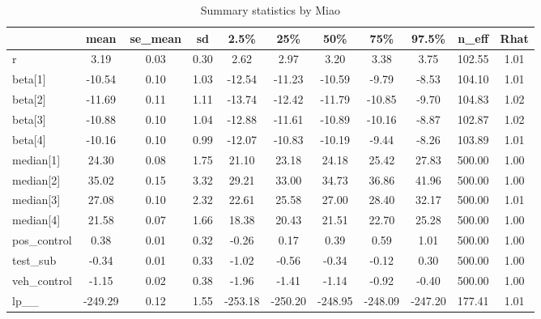 \documentclass[]{article}
\begin{document}
\begin{table}

\caption{\label{tab:result2}Summary statistics by Miao}
\centering
\begin{tabular}[t]{l|c|c|c|c|c|c|c|c|c|c}
\hline
  & mean & se\_mean & sd & 2.5\% & 25\% & 50\% & 75\% & 97.5\% & n\_eff & Rhat\\
\hline
r & 3.19 & 0.03 & 0.30 & 2.62 & 2.97 & 3.20 & 3.38 & 3.75 & 102.55 & 1.01\\
\hline
beta[1] & -10.54 & 0.10 & 1.03 & -12.54 & -11.23 & -10.59 & -9.79 & -8.53 & 104.10 & 1.01\\
\hline
beta[2] & -11.69 & 0.11 & 1.11 & -13.74 & -12.42 & -11.79 & -10.85 & -9.70 & 104.83 & 1.02\\
\hline
beta[3] & -10.88 & 0.10 & 1.04 & -12.88 & -11.61 & -10.89 & -10.16 & -8.87 & 102.87 & 1.02\\
\hline
beta[4] & -10.16 & 0.10 & 0.99 & -12.07 & -10.83 & -10.19 & -9.44 & -8.26 & 103.89 & 1.01\\
\hline
median[1] & 24.30 & 0.08 & 1.75 & 21.10 & 23.18 & 24.18 & 25.42 & 27.83 & 500.00 & 1.00\\
\hline
median[2] & 35.02 & 0.15 & 3.32 & 29.21 & 33.00 & 34.73 & 36.86 & 41.96 & 500.00 & 1.00\\
\hline
median[3] & 27.08 & 0.10 & 2.32 & 22.61 & 25.58 & 27.00 & 28.40 & 32.17 & 500.00 & 1.01\\
\hline
median[4] & 21.58 & 0.07 & 1.66 & 18.38 & 20.43 & 21.51 & 22.70 & 25.28 & 500.00 & 1.00\\
\hline
pos\_control & 0.38 & 0.01 & 0.32 & -0.26 & 0.17 & 0.39 & 0.59 & 1.01 & 500.00 & 1.00\\
\hline
test\_sub & -0.34 & 0.01 & 0.33 & -1.02 & -0.56 & -0.34 & -0.12 & 0.30 & 500.00 & 1.00\\
\hline
veh\_control & -1.15 & 0.02 & 0.38 & -1.96 & -1.41 & -1.14 & -0.92 & -0.40 & 500.00 & 1.00\\
\hline
lp\_\_ & -249.29 & 0.12 & 1.55 & -253.18 & -250.20 & -248.95 & -248.09 & -247.20 & 177.41 & 1.01\\
\hline
\end{tabular}
\end{table}
\end{document}
